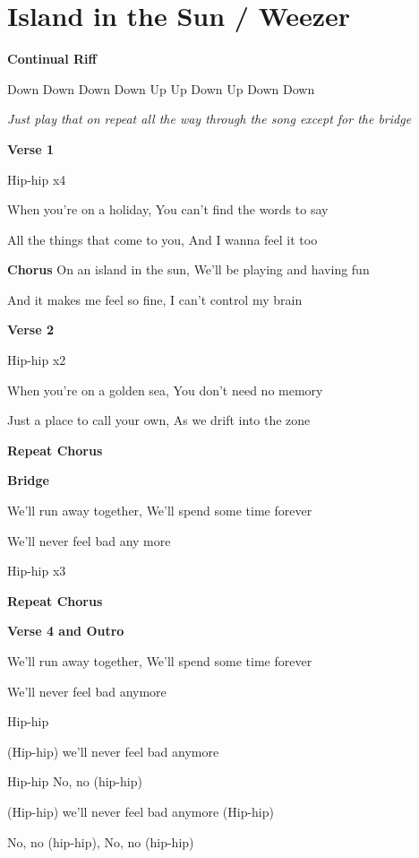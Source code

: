 \section{Island in the Sun / Weezer}\label{sec:islandinthesun}

  \Eminor
  \Aminor
  \Dmajor
  \Gmajor
  \Cmajor
  \Amajor
  
 \textbf{Continual Riff}
 
  Down Down  Down Down  Up Up Down Up   Down Down
 
\emph{Just play that on repeat all the way through the song except for the bridge}

\textbf{Verse 1}

Hip-hip x4

When you're on a holiday, You can't find the words to say

All the things that come to you, And I wanna feel it too

\textbf{Chorus}
On an island in the sun, We'll be playing and having fun

And it makes me feel so fine, I can't control my brain

\textbf{Verse 2}

Hip-hip x2

When you're on a golden sea, You don't need no memory

Just a place to call your own, As we drift into the zone

\textbf{Repeat Chorus}

\textbf{Bridge}

We'll run away together, We'll spend some time forever

We'll never feel bad any more

Hip-hip x3

\textbf{Repeat Chorus}

\textbf{Verse 4 and Outro}

We'll run away together, We'll spend some time forever

We'll never feel bad anymore

Hip-hip

(Hip-hip) we'll never feel bad anymore

Hip-hip No, no (hip-hip)

(Hip-hip) we'll never feel bad anymore (Hip-hip)

No, no (hip-hip), No, no (hip-hip)
